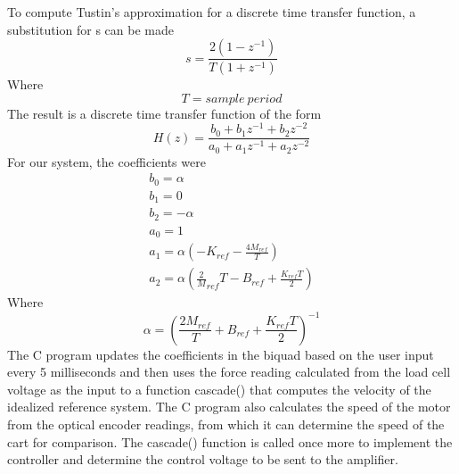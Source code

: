 To compute Tustin's approximation for a discrete time transfer function, a substitution for s can be made
\begin{equation}
s=\frac{2(1-z^{-1})}{T(1+z^{-1})}
\end{equation}
Where
\begin{equation}
T= sample\ period
\end{equation}
The result is a discrete time transfer function of the form
\begin{equation}
H(z)=\frac{b_{0}+b_{1}z^{-1}+b_{2}z^{-2}}{a_{0}+a_{1}z^{-1}+a_{2}z^{-2}}
\end{equation}
For our system, the coefficients were
\begin{eqnarray}
b_{0}=\alpha \\
b_{1}=0 \\
b_{2}=-\alpha \\
a_{0}=1 \\
a_{1}=\alpha(-K_{ref}-\frac{4M_{ref}}{T}) \\
a_{2}=\alpha(\frac2M_{ref}{T}-B_{ref}+\frac{K_{ref}T}{2})
\end{eqnarray}
Where
\begin{equation}
\alpha=(\frac{2M_{ref}}{T}+B_{ref}+\frac{K_{ref}T}{2})^{-1}
\end{equation}
The C program updates the coefficients in the biquad based on the user input every 5 milliseconds and then uses the force reading calculated from the load cell voltage as the input to a function cascade() that computes the velocity of the idealized reference system. The C program also calculates the speed of the motor from the optical encoder readings, from which it can determine the speed of the cart for comparison. The cascade() function is called once more to implement the controller and determine the control voltage to be sent to the amplifier. 